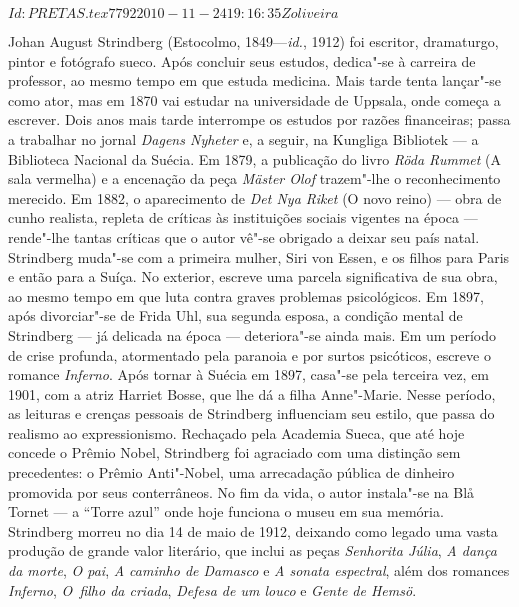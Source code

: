 \SVN $Id: PRETAS.tex 7792 2010-11-24 19:16:35Z oliveira $
\begin{resumopage}

\item[Johan August Strindberg] (Estocolmo, 1849---\textit{id.}, 1912) 
foi escritor, dramaturgo, pintor e fotógrafo sueco. Após concluir
seus estudos, dedica"-se à carreira de professor, ao mesmo tempo em que
estuda medicina. Mais tarde tenta lançar"-se como ator, mas em 1870 vai
estudar na universidade de Uppsala, onde começa a escrever. Dois anos
mais tarde interrompe os estudos por razões financeiras; passa a
trabalhar no jornal \textit{Dagens Nyheter} e, a seguir, na
Kungliga Bibliotek --- a Biblioteca Nacional da Suécia.
Em 1879, a publicação do livro \textit{Röda Rummet} (A sala vermelha) e
a encenação da peça \textit{Mäster Olof} trazem"-lhe o reconhecimento
merecido. Em 1882, o aparecimento de \textit{Det Nya Riket} (O novo
reino) --- obra de cunho realista, repleta de críticas às instituições
sociais vigentes na época --- rende"-lhe tantas críticas que o autor vê"-se
obrigado a deixar seu país natal. Strindberg muda"-se com a primeira
mulher, Siri von Essen, e os filhos para Paris e então para a Suíça. No
exterior, escreve uma parcela significativa de sua obra, ao mesmo tempo
em que luta contra graves problemas psicológicos. Em 1897, após
divorciar"-se de Frida Uhl, sua segunda esposa, a condição mental de
Strindberg --- já delicada na época --- deteriora"-se ainda mais. Em um
período de crise profunda, atormentado pela paranoia e por surtos
psicóticos, escreve o romance \textit{Inferno}. Após tornar à Suécia em
1897, casa"-se pela terceira vez, em 1901, com a atriz Harriet Bosse,
que lhe dá a filha Anne"-Marie. Nesse período, as leituras e crenças
pessoais de Strindberg influenciam seu estilo, que passa do realismo ao
expressionismo. Rechaçado pela Academia Sueca, que até 
hoje concede o Prêmio Nobel, Strindberg foi agraciado com uma 
distinção sem precedentes: o Prêmio Anti"-Nobel, uma arrecadação 
pública de dinheiro promovida por seus conterrâneos. 
No fim da vida, o autor instala"-se na Blå Tornet --- a “Torre azul” 
onde hoje funciona o museu em sua memória.
Strindberg morreu no dia 14 de maio de 1912, deixando como legado uma
vasta produção de grande valor literário, que inclui as peças
\textit{Senhorita Júlia}, \textit{A dança da morte}, \textit{O pai},
\textit{A caminho de Damasco} e \textit{A sonata espectral}, além dos
romances \textit{Inferno}, \textit{O~filho da criada}, \textit{Defesa
de um louco} e \textit{Gente de Hemsö}. 


\end{resumopage}
